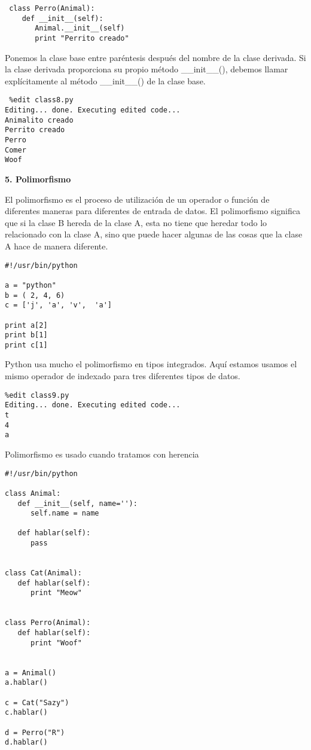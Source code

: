 \documentclass[twoside,10.5pt]{article}%
\begin{document}
\begin{verbatim}
 class Perro(Animal):
    def __init__(self):
       Animal.__init__(self)
       print "Perrito creado"
\end{verbatim}

Ponemos la clase base  entre par\'entesis despu\'es del nombre de la clase derivada. Si la clase derivada proporciona su propio m\'etodo {\color{blue}\_\_init\_\_()}, debemos llamar expl\'icitamente al m\'etodo  {\color{blue}\_\_init\_\_()} de la clase base.

\begin{verbatim}
 %edit class8.py
Editing... done. Executing edited code...
Animalito creado
Perrito creado
Perro
Comer
Woof
\end{verbatim}


\textbf{5. Polimorfismo}

El polimorfismo es el proceso de utilizaci\'on de un operador o funci\'on de diferentes maneras para diferentes de entrada de datos. El polimorfismo significa que si la clase B hereda de la clase A, esta no tiene que heredar todo lo relacionado con la clase A, sino que puede hacer algunas de las cosas que la clase A hace de manera diferente.

\begin{verbatim}
#!/usr/bin/python

a = "python"
b = ( 2, 4, 6)
c = ['j', 'a', 'v',  'a']

print a[2]
print b[1]
print c[1]
\end{verbatim}


Python usa mucho el polimorfismo en tipos integrados. Aqu\'i estamos usamos el mismo operador de indexado para tres diferentes tipos de datos.

\begin{verbatim}
%edit class9.py
Editing... done. Executing edited code...
t
4
a
\end{verbatim}

Polimorfismo es usado cuando tratamos con herencia

\begin{verbatim}
#!/usr/bin/python

class Animal:
   def __init__(self, name=''):
      self.name = name

   def hablar(self):
      pass


class Cat(Animal):
   def hablar(self):
      print "Meow"


class Perro(Animal):
   def hablar(self):
      print "Woof"


a = Animal()
a.hablar()

c = Cat("Sazy")
c.hablar()

d = Perro("R")
d.hablar()
\end{verbatim}
\end{document}
